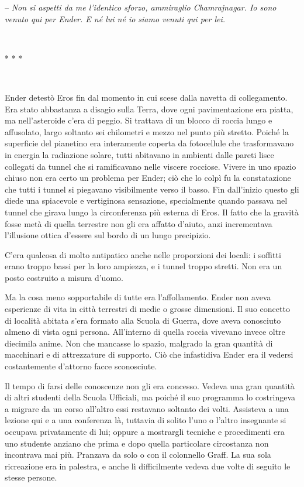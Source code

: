 {-- \emph{Non si aspetti da me l'identico sforzo, ammiraglio
		Chamrajnagar. Io sono venuto qui per Ender. E né lui né io siamo venuti
		qui per lei.}}

{~}

\begin{center}
	{* * *}
\end{center}

{~}

{Ender detestò Eros fin dal momento in cui scese dalla navetta di
	collegamento. Era stato abbastanza a disagio sulla Terra, dove ogni
	pavimentazione era piatta, ma nell'asteroide c'era di peggio. Si
	trattava di un blocco di roccia lungo e affusolato, largo soltanto sei
	chilometri e mezzo nel punto più stretto. Poiché la superficie del
	pianetino era interamente coperta da fotocellule che trasformavano in
	energia la radiazione solare, tutti abitavano in ambienti dalle pareti
	lisce collegati da tunnel che si ramificavano nelle viscere rocciose.
	Vivere in uno spazio chiuso non era certo un problema per Ender; ciò che
	lo colpì fu la constatazione che tutti i tunnel si piegavano
	visibilmente verso il basso. Fin dall'inizio questo gli diede una
	spiacevole e vertiginosa sensazione, specialmente quando passava nel
	tunnel che girava lungo la circonferenza più esterna di Eros. Il fatto
	che la gravità fosse metà di quella terrestre non gli era affatto
	d'aiuto, anzi incrementava l'illusione ottica d'essere sul bordo di un
	lungo precipizio.}

{C'era qualcosa di molto antipatico anche nelle proporzioni dei locali:
	i soffitti erano troppo bassi per la loro ampiezza, e i tunnel troppo
	stretti. Non era un posto costruito a misura d'uomo.}

{Ma la cosa meno sopportabile di tutte era l'affollamento. Ender non
	aveva esperienze di vita in città terrestri di medie o grosse
	dimensioni. Il suo concetto di località abitata s'era formato alla
	Scuola di Guerra, dove aveva conosciuto almeno di vista ogni persona.
	All'interno di quella roccia vivevano invece oltre diecimila anime. Non
	che mancasse lo spazio, malgrado la gran quantità di macchinari e di
	attrezzature di supporto. Ciò che infastidiva Ender era il vedersi
	costantemente d'attorno facce sconosciute.}

{Il tempo di farsi delle conoscenze non gli era concesso. Vedeva una
	gran quantità di altri studenti della Scuola Ufficiali, ma poiché il suo
	programma lo costringeva a migrare da un corso all'altro essi restavano
	soltanto dei volti. Assisteva a una lezione qui e a una conferenza là,
	tuttavia di solito l'uno o l'altro insegnante si occupava privatamente
	di lui; oppure a mostrargli tecniche e procedimenti era uno studente
	anziano che prima e dopo quella particolare circostanza non incontrava
	mai più. Pranzava da solo o con il colonnello Graff. La sua sola
	ricreazione era in palestra, e anche lì difficilmente vedeva due volte
	di seguito le stesse persone.}

